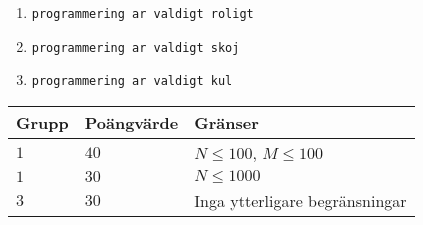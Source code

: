 \begin{enumerate}
    \item \texttt{programmering ar valdigt roligt}
    \item \texttt{programmering ar valdigt skoj}
    \item \texttt{programmering ar valdigt kul}
\end{enumerate}

\noindent
\begin{tabular}{| l | l | l |}
  \hline
  Grupp & Poängvärde & Gränser \\ \hline
  $1$   & $40$       & $N \leq 100$, $M \leq 100$ \\ \hline
  $1$   & $30$       & $N \leq 1000$ \\ \hline
  $3$   & $30$       & Inga ytterligare begränsningar \\ \hline
\end{tabular}
